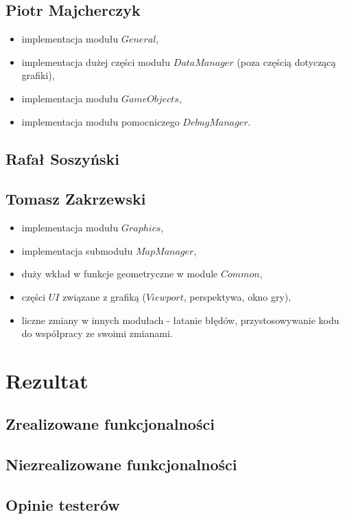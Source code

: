 \documentclass[licencjacka]{pracamgr}
\begin{document}
  \section{Piotr Majcherczyk}
  \begin{itemize}
   \item implementacja modułu $General$,
   \item implementacja dużej części modułu $DataManager$ (poza częścią dotyczącą grafiki),
   \item implementacja modułu $GameObjects$,
   \item implementacja modułu pomocniczego $DebugManager$.
  \end{itemize}

  \section{Rafał Soszyński}

  \section{Tomasz Zakrzewski}
  \begin{itemize}
   \item implementacja modułu $Graphics$,
   \item implementacja submodułu $MapManager$,
   \item duży wkład w funkcje geometryczne w module $Common$,
   \item części $UI$ związane z grafiką ($Viewport$, perspektywa, okno gry),
   \item liczne zmiany w innych modułach - łatanie błędów, przystosowywanie kodu do współpracy ze swoimi zmianami.
  \end{itemize}

\chapter{Rezultat}

  \section{Zrealizowane funkcjonalności}

  \section{Niezrealizowane funkcjonalności}

  \section{Opinie testerów}
\end{document}
